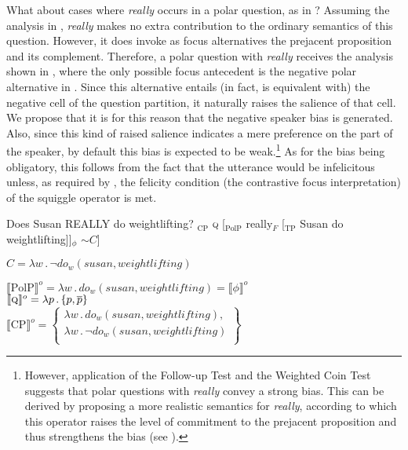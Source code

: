 \documentclass[output=paper,colorlinks,citecolor=brown]{langscibook}
\begin{document}
What about cases where \textit{really} occurs in a polar question, as in ? Assuming the analysis in , \textit{really} makes no extra contribution to the ordinary semantics of this question. However, it does invoke as focus alternatives the prejacent proposition and its complement. Therefore, a polar question with \textit{really} receives the analysis shown in , where the only possible focus antecedent is the negative polar alternative in . Since this alternative entails (in fact, is equivalent with) the negative cell of the question partition, it naturally raises the salience of that cell. We propose that it is for this reason that the negative speaker bias is generated. Also, since this kind of raised salience indicates a mere preference on the part of the speaker, by default this bias is expected to be weak.\footnote{However, application of the Follow-up Test and the Weighted Coin Test suggests that polar questions with \textit{really} convey a strong bias. This can be derived by proposing a more realistic semantics for \textit{really}, according to which this operator raises the level of commitment to the prejacent proposition and thus strengthens the bias (see \citealt{Bill2022}). } As for the bias being obligatory, this follows from the fact that the utterance would be infelicitous unless, as required by , the felicity condition (the contrastive focus interpretation) of the squiggle operator is met. 

\is{}
\ea Does Susan REALLY do weightlifting?\label{RlyQ.Anlys}
    \ea {[}$_{\text{CP}}$ \textsc{q} [$_{\text{PolP}}$ really$_{F}$ [$_{\text{TP}}$ Susan do weightlifting]]$_{\phi}$ $\sim C$]\label{RlyQ.Anlys.LF}
    
    \ex $C = \lambda w \, . \,\neg do_w(susan, weightlifting)$\label{RlyQ.Anlys.C}
    
    \ex $\llbracket \text{PolP} \rrbracket^{o}  = \lambda w \, . \, do_w(susan, weightlifting) = \llbracket \phi \rrbracket^{o}$ \\
        $\llbracket \textsc{q} \rrbracket^{o} = \lambda p \, . \, \{p, \overline{p}\}$ \\
        $\llbracket \text{CP} \rrbracket^{o} = \left\{ \begin{array}{l}
            \lambda w \, . \, do_w(susan,weightlifting), \\ 
            \lambda w \, . \,\neg do_w(susan,weightlifting) \\ 
            \end{array} \right\}$\label{RlyQ.Anyls.Q}
            
\end{document}
